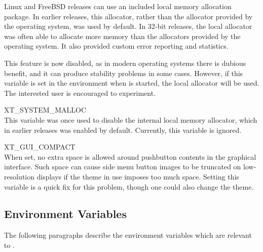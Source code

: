 \begin{description}
Linux and FreeBSD releases can use an included local memory allocation
package.  In earlier {\Xic} releases, this allocator, rather than the
allocator provided by the operating system, was used by default.  In
32-bit releases, the local allocator was often able to allocate more
memory than the allocators provided by the operating system.  It also
provided custom error reporting and statistics.

This feature is now disabled, as in modern operating systems there is
dubious benefit, and it can produce stability problems in some cases. 
However, if this variable is set in the environment when {\Xic} is
started, the local allocator will be used.  The interested user is
encouraged to experiment.

\item{\et XT\_SYSTEM\_MALLOC}\\
This variable was once used to disable the internal local memory
allocator, which in earlier releases was enabled by default. 
Currently, this variable is ignored.

\item{\et XT\_GUI\_COMPACT}\\
When set, no extra space is allowed around pushbutton contents in the
graphical interface.  Such space can cause side menu button images to
be truncated on low-resolution displays if the theme in use imposes
too much space.  Setting this variable is a quick fix for this
problem, though one could also change the theme.
\end{description}

\subsection{{\Xic} Environment Variables}

The following paragraphs describe the environment variables which are
relevant to {\Xic}.

